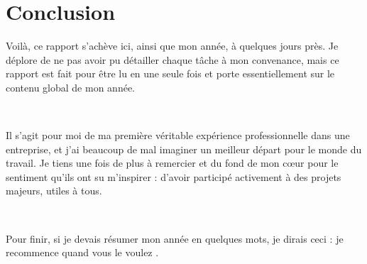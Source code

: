 \chapter*{Conclusion}
Voilà, ce rapport s'achève ici, ainsi que mon année, à quelques jours près. Je déplore de ne pas avoir pu détailler chaque tâche à mon convenance, mais ce rapport est fait pour être lu en une seule fois et porte essentiellement sur le contenu global de mon année.

~

Il s'agit pour moi de ma première véritable expérience professionnelle dans une entreprise, et j'ai beaucoup de mal imaginer un meilleur départ pour le monde du travail. Je tiens une fois de plus à remercier \solulog{} et \fidit{} du fond de mon cœur pour le sentiment qu'ils ont su m'inspirer : d'avoir participé activement à des projets majeurs, utiles à tous.

~

Pour finir, si je devais résumer mon année en quelques mots, je dirais ceci : \og je recommence quand vous le voulez \fg.

